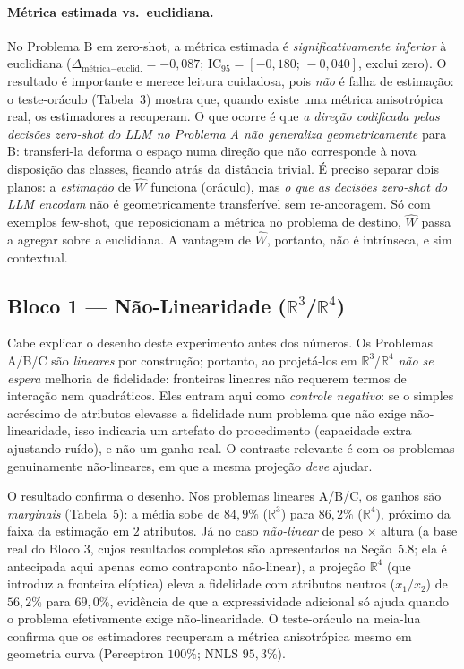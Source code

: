 \documentclass[12pt,a4paper]{article}
\newcommand{\West}{\ensuremath{\hat{W}}}   %
\begin{document}
\paragraph{Métrica estimada vs.\ euclidiana.}
No Problema B em zero-shot, a métrica estimada é \emph{significativamente inferior} à
euclidiana ($\Delta_{\text{métrica}-\text{euclid.}} = -0{,}087$;
IC$_{95} = [-0{,}180;\,-0{,}040]$, exclui zero). O resultado é importante e merece leitura
cuidadosa, pois \emph{não} é falha de estimação: o teste-oráculo
(Tabela~3) mostra que, quando existe uma métrica anisotrópica real, os
estimadores a recuperam. O que ocorre é que \emph{a direção codificada pelas decisões
zero-shot do LLM no Problema A não generaliza geometricamente} para B: transferi-la deforma
o espaço numa direção que não corresponde à nova disposição das classes, ficando atrás da
distância trivial. É preciso separar dois planos: a \emph{estimação} de \West{} funciona
(oráculo), mas \emph{o que as decisões zero-shot do LLM encodam} não é geometricamente
transferível sem re-ancoragem. Só com exemplos few-shot, que reposicionam a métrica no
problema de destino, \West{} passa a agregar sobre a euclidiana. A vantagem de \West{}, portanto,
não é intrínseca, e sim contextual.

\FloatBarrier

\subsection{Bloco 1 — Não-Linearidade (\texorpdfstring{$\mathbb{R}^3$/$\mathbb{R}^4$}{R3/R4})}

Cabe explicar o desenho deste experimento antes dos números. Os Problemas A/B/C são
\emph{lineares} por construção; portanto, ao projetá-los em $\mathbb{R}^3$/$\mathbb{R}^4$
\emph{não se espera} melhoria de fidelidade: fronteiras lineares não requerem termos de
interação nem quadráticos. Eles entram aqui como \emph{controle negativo}: se o simples
acréscimo de atributos elevasse a fidelidade num problema que não exige não-linearidade,
isso indicaria um artefato do procedimento (capacidade extra ajustando ruído), e não um
ganho real. O contraste relevante é com os problemas genuinamente não-lineares, em que a
mesma projeção \emph{deve} ajudar.

O resultado confirma o desenho. Nos problemas lineares A/B/C, os ganhos são
\emph{marginais} (Tabela~5): a média sobe de $84{,}9\%$
($\mathbb{R}^3$)
para $86{,}2\%$ ($\mathbb{R}^4$), próximo da faixa da estimação em $2$ atributos. Já no
caso
\emph{não-linear} de peso $\times$ altura (a base real do Bloco 3, cujos resultados
completos são apresentados na Seção~5.8; ela é antecipada aqui apenas
como contraponto não-linear), a projeção $\mathbb{R}^4$ (que
introduz a
fronteira elíptica) eleva a fidelidade com atributos neutros ($x_1/x_2$) de
$56{,}2\%$ para $69{,}0\%$, evidência de que a expressividade adicional só ajuda quando o
problema efetivamente exige não-linearidade. O teste-oráculo na meia-lua confirma que os
estimadores recuperam a métrica anisotrópica mesmo em geometria curva (Perceptron $100\%$;
NNLS $95{,}3\%$).
\end{document}

